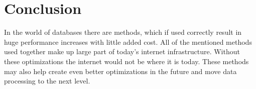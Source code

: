 \documentclass[10pt,twoside,a4paper]{article}
\begin{document}
\section{Conclusion}
In the world of databases there are methods, which if used correctly result in huge performance increases with little added cost. All of the mentioned methods used together make up large part of today's internet infrastructure. Without these optimizations the internet would not be where it is today. These methods may also help create even better optimizations in the future and move data processing to the next level. %





\end{document}

